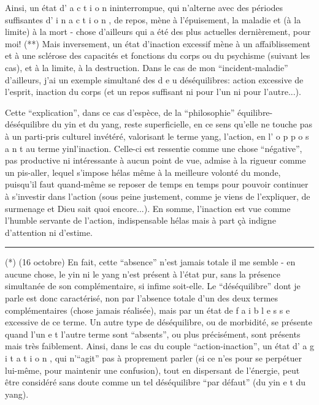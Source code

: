 Ainsi, un état d' a c t i o n ininterrompue, qui n'alterne avec des périodes suffisantes d' i n a c t i o n , de repos, mène à l'épuisement, la maladie et (à la limite) à la mort - chose d'ailleurs qui a été des plus actuelles dernièrement, pour moi! (**) Mais inversement, un état d'inaction excessif mène à un affaiblissement et à une sclérose des capacités et fonctions du corps ou du psychisme (suivant les cas), et à la limite, à la destruction. Dans le cas de mon ``incident-maladie'' d'ailleurs, j'ai un exemple simultané des d e u  déséquilibres: action excessive de l'esprit, inaction du corps (et un repos suffisant ni pour l'un ni pour l'autre...).

Cette ``explication'', dans ce cas d'espèce, de la ``philosophie'' équilibre-déséquilibre du yin et du yang, reste superficielle, en ce sens qu'elle ne touche pas à un parti-pris culturel invétéré, valorisant le terme yang, l'action, en l' o p p o s a n t au terme yin\handwritten{,}l'inaction. Celle-ci est ressentie comme une chose ``négative'', pas productive ni intéressante à aucun point de vue, admise à la rigueur comme un pis-aller, lequel s'impose hélas même à la meilleure volonté du monde, puisqu'il faut quand-même se reposer de temps en temps pour pouvoir continuer à s'investir dans l'action (sous peine justement, comme je viens de l'expliquer, de surmenage et Dieu sait quoi encore...). En somme, l'inaction est vue comme l'humble servante de l'action, indispensable hélas mais à part çà indigne d'attention ni d'estime.

\noindent\rule{.22\linewidth}{.4pt}\par
(*) (16 octobre) En fait, cette ``absence'' n'est jamais totale il me semble - en aucune chose, le yin ni le yang n'est présent à l'état pur, sans la présence simultanée de son complémentaire, si infime soit-elle. Le ``déséquilibre'' dont je parle est donc caractérisé, non par l'absence totale d'un des deux termes complémentaires (chose jamais réalisée), mais par un état de f a i b l e s s e excessive de ce terme. Un autre type de déséquilibre, ou de morbidité, se présente quand l'un e t l'autre terme sont ``absents'', ou plus précisément, sont présents mais très faiblement. Ainsi, dans le cas du couple ``action-inaction'', un état d' a g i t a t i o n , qui n'``agit'' pas à proprement parler (si ce n'es pour se perpétuer lui-même, pour maintenir une confusion), tout en dispersant de l'énergie, peut être considéré sans doute comme un tel déséquilibre ``par défaut'' (du yin e t du yang).

